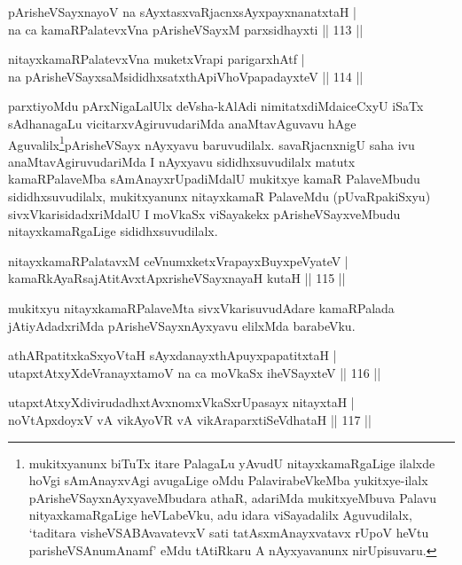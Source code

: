 \begin{shl}
pArisheVSayxnayoV na sAyxtasxvaRjacnxsAyxpayxnanatxtaH |\\
na ca kamaRPalatevxVna pArisheVSayxM parxsidhayxti \hfill || 113 ||
\end{shl}

\begin{shl}
nitayxkamaRPalatevxVna muketxVrapi parigarxhAtf |\\
na pArisheVSayxsaMsididhxsatxthA\s piVhoVpapadayxteV \hfill || 114 ||
\end{shl}

\begin{artha}
parxtiyoMdu pArxNigaLalUlx deVsha-kAlAdi nimitatxdiMda\break iceCxyU iSaTx sAdhanagaLu vicitarxvAgiruvudariMda anaMtavAguvavu hAge Aguvalilx\footnote{mukitxyanunx biTuTx itare PalagaLu yAvudU nitayxkamaRgaLige ilalxde hoVgi sAmAnayxvAgi avugaLige oMdu PalavirabeVkeMba yukitxye-ilalx pArisheVSayxnAyxyaveMbudara athaR, adariMda mukitxyeMbuva Palavu nityaxkamaRgaLige heVLabeVku, adu idara viSayadalilx Aguvudilalx, `taditara visheVSABAvavatevxV sati tatAsxmAnayxvatavx rUpoV heVtu parisheVSAnumAnamf' eMdu tAtiRkaru A nAyxyavanunx nirUpisuvaru.}pArisheVSayx nAyxyavu baruvudilalx. savaRjacnxnigU saha ivu anaMtavAgiruvudariMda I nAyxyavu sididhxsuvudilalx matutx kamaRPalaveMba sAmAnayxrUpadiMdalU mukitxye kamaR PalaveMbudu sididhxsuvudilalx, mukitxyanunx nitayxkamaR PalaveMdu (pUvaRpakiSxyu) sivxVkarisidadxriMdalU I moVkaSx viSayakekx pArisheVSayxveMbudu nitayxkamaRgaLige sididhxsuvudilalx.
\end{artha}

\begin{shl}
nitayxkamaRPalatavxM ceVnumxketxVrapayxBuyxpeVyateV |\\
kamaRkAyaRsajAtitAvxtApxrisheVSayxnayaH kutaH \hfill || 115 ||
\end{shl}

\begin{artha}
mukitxyu nitayxkamaRPalaveMta sivxVkarisuvudAdare kamaRPalada jAtiyAdadx\-riMda pArisheVSayxnAyxyavu elilxMda barabeVku.
\end{artha}

\begin{shl}
athARpatitxkaSxyoV\s taH sAyxdanayxthA\s puyxpapatitxtaH |\\
utapxtAtxyXdeVranayxtamoV na ca moVkaSx iheVSayxteV \hfill || 116 ||
\end{shl}

\begin{shl}
utapxtAtxyXdivirudadhxtAvxnomxVkaSxrUpasayx nitayxtaH |\\
noVtApxdoyxV vA vikAyoVR vA vikAraparxtiSeVdhataH \hfill || 117 ||
\end{shl}

